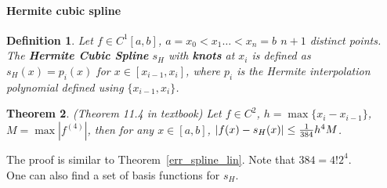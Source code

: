 \documentclass[20pt]{article} %
\theoremstyle{break}
\newtheorem{definition}{Definition}[section]
\newtheorem{thm}[definition]{Theorem}
\begin{document}
\newpage

\paragraph{Hermite cubic spline}

\begin{definition} Let $f\in C^1[a, b]$,  $a=x_0<x_1\dots <x_n=b$ $n+1$ distinct points. The {\bf Hermite Cubic Spline} $s_H$ with {\bf knots} at $x_i$ is defined as $s_H(x)=p_i(x)$ for $x\in [x_{i-1}, x_i]$, where $p_i$ is the Hermite interpolation polynomial defined using $\{x_{i-1}, x_i\}$.
\end{definition}


\begin{thm}\label{err_spline_her} (Theorem 11.4 in textbook)
Let $f\in C^2$, $h=\max\{x_i-x_{i-1}\}$, $M=\max|f^{(4)}|$, then for any $x\in [a, b]$, $|f(x)-s_H(x)|\leq {1\over 384}h^4M$.
\end{thm}
The proof is similar to Theorem~\ref{err_spline_lin}. Note that $384=4!2^4$.\\

One can also find a set of basis functions for $s_H$.




\end{document}
